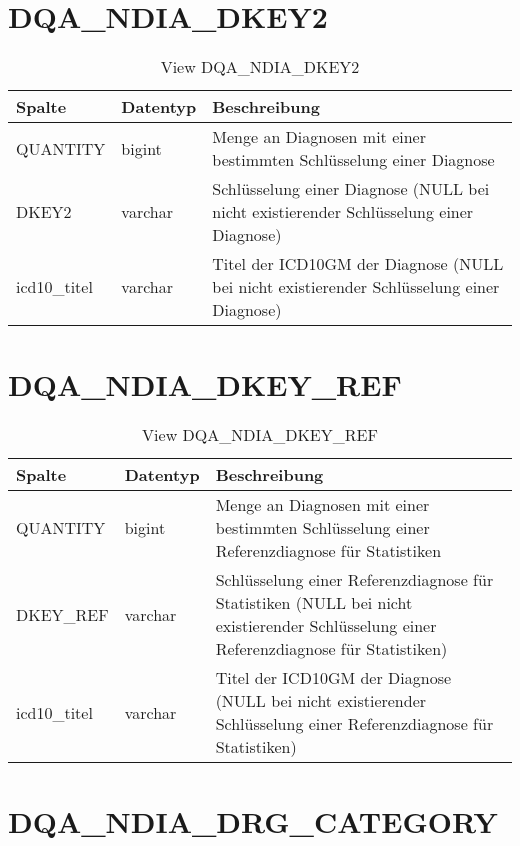   \section{DQA\_NDIA\_DKEY2}

  \begin{table}[ht]
    \centering
    \caption{View DQA\_NDIA\_DKEY2}
    \label{tab:dqandiadkey2}
    \begin{tabular}{||l|l|p{10cm}||}
      \hline
      Spalte & Datentyp & Beschreibung \\ [0.5ex] \hline \hline
QUANTITY & bigint & Menge an Diagnosen mit einer bestimmten Schlüsselung einer Diagnose \\ \hline
DKEY2 & varchar & Schlüsselung einer Diagnose (NULL bei nicht existierender Schlüsselung einer Diagnose)\\ \hline
icd10\_titel & varchar & Titel der ICD10GM der Diagnose (NULL bei nicht existierender Schlüsselung einer Diagnose)\\ \hline
    \end{tabular}
  \end{table}

  \section{DQA\_NDIA\_DKEY\_REF}

  \begin{table}[ht]
    \centering
    \caption{View DQA\_NDIA\_DKEY\_REF}
    \label{tab:dqandiadkeyref}
    \begin{tabular}{||l|l|p{10cm}||}
      \hline
      Spalte & Datentyp & Beschreibung \\ [0.5ex] \hline \hline
QUANTITY & bigint & Menge an Diagnosen mit einer bestimmten Schlüsselung einer Referenzdiagnose für Statistiken \\ \hline
DKEY\_REF & varchar & Schlüsselung einer Referenzdiagnose für Statistiken (NULL bei nicht existierender Schlüsselung einer Referenzdiagnose für Statistiken)\\ \hline
icd10\_titel & varchar & Titel der ICD10GM der Diagnose (NULL bei nicht existierender Schlüsselung einer Referenzdiagnose für Statistiken)\\ \hline
    \end{tabular}
  \end{table}
 
 \clearpage
 
  \section{DQA\_NDIA\_DRG\_CATEGORY}

